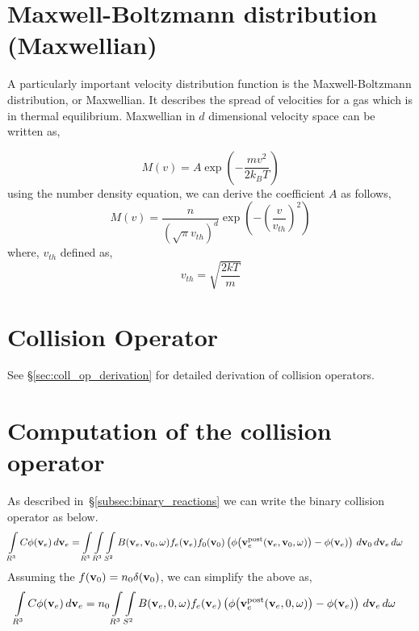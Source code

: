 \documentclass{article}[draft]
\begin{document}
\section{Maxwell-Boltzmann distribution (Maxwellian)}
\label{sec:maxwellian}
A particularly important velocity distribution function is the Maxwell-Boltzmann distribution, or Maxwellian. It describes the spread of velocities for a gas which is in thermal equilibrium. Maxwellian in $d$ dimensional velocity space can be written as,

\begin{equation}
    M(v) = A \exp(-\frac{mv^2}{2k_BT})
\end{equation}
using the number density equation, we can derive the coefficient $A$ as follows, 
\begin{equation}
M(v) = \frac{n}{(\sqrt{\pi}v_{th})^d} \exp{\left(-\left(\frac{v}{v_{th}}\right)^2 \right)}    
\end{equation} where, $v_{th}$ defined as, 
\begin{equation}
    v_{th} = \sqrt{\frac{2kT}{m}}
\end{equation}




\section{Collision Operator}
\label{sec:collision_operator}
See \S\ref{sec:coll_op_derivation} for detailed derivation of collision operators. 
  

\section{Computation of the collision operator}
As described in~\S\ref{subsec:binary_reactions} we can write the binary collision operator as below.  
\begin{align*}
\myint_{R^3} C \phi\of{\vect{v}_e} \diff{\vect{v}_e} 
&=
\myint_{R^3} \myint_{R^3} \myint_{S^2} 
B\of{\vect{v}_e, \vect{v}_0, \vect{\omega}} 
f_e\of{\vect{v}_e} f_0\of{\vect{v}_0} 
\left(
\phi\of{\vect{v}_e^\text{post}\of{\vect{v}_e, \vect{v}_0, \vect{\omega}}} 
- \phi\of{\vect{v}_e} 
\right)
\diff{\vect{v}_0} \diff{\vect{v}_e} \diff{\vect{\omega}}
\end{align*}
Assuming the $f(\mathbf{v}_0)= n_0\delta(\mathbf{v}_0)$, we can simplify the above as, 
\begin{align*}
\myint_{R^3} C \phi\of{\vect{v}_e} \diff{\vect{v}_e} 
&=
n_0 \myint_{R^3} \myint_{S^2} 
B\of{\vect{v}_e, 0, \vect{\omega}} 
f_e\of{\vect{v}_e}
\left(
\phi\of{\vect{v}_e^\text{post}\of{\vect{v}_e, 0, \vect{\omega}}} 
- \phi\of{\vect{v}_e} 
\right)
\diff{\vect{v}_e} \diff{\vect{\omega}}
\end{align*}
\end{document}
